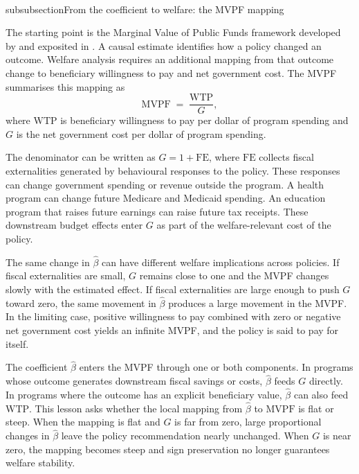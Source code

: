 \documentclass[11pt]{article}
\begin{document}
\\subsubsection{From the coefficient to welfare: the MVPF mapping}

The starting point is the Marginal Value of Public Funds framework developed by \textcite{hendren2020unified} and exposited in \textcite{finkelstein2020welfare}. A causal estimate identifies how a policy changed an outcome. Welfare analysis requires an additional mapping from that outcome change to beneficiary willingness to pay and net government cost. The MVPF summarises this mapping as
\begin{equation*}
\mathrm{MVPF} \;=\; \frac{\mathrm{WTP}}{G},
\end{equation*}
where \(\mathrm{WTP}\) is beneficiary willingness to pay per dollar of program spending and \(G\) is the net government cost per dollar of program spending.

The denominator can be written as \(G = 1 + \mathrm{FE}\), where \(\mathrm{FE}\) collects fiscal externalities generated by behavioural responses to the policy. These responses can change government spending or revenue outside the program. A health program can change future Medicare and Medicaid spending. An education program that raises future earnings can raise future tax receipts. These downstream budget effects enter \(G\) as part of the welfare-relevant cost of the policy.

The same change in \(\hat\beta\) can have different welfare implications across policies. If fiscal externalities are small, \(G\) remains close to one and the MVPF changes slowly with the estimated effect. If fiscal externalities are large enough to push \(G\) toward zero, the same movement in \(\hat\beta\) produces a large movement in the MVPF. In the limiting case, positive willingness to pay combined with zero or negative net government cost yields an infinite MVPF, and the policy is said to pay for itself.

The coefficient \(\hat\beta\) enters the MVPF through one or both components. In programs whose outcome generates downstream fiscal savings or costs, \(\hat\beta\) feeds \(G\) directly. In programs where the outcome has an explicit beneficiary value, \(\hat\beta\) can also feed \(\mathrm{WTP}\). This lesson asks whether the local mapping from \(\hat\beta\) to \(\mathrm{MVPF}\) is flat or steep. When the mapping is flat and \(G\) is far from zero, large proportional changes in \(\hat\beta\) leave the policy recommendation nearly unchanged. When \(G\) is near zero, the mapping becomes steep and sign preservation no longer guarantees welfare stability.
\end{document}
